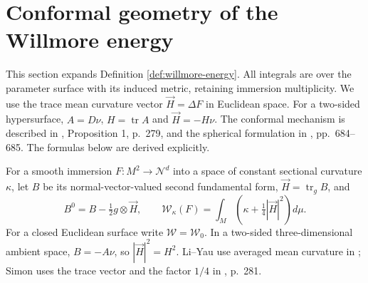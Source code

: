 \chapter{Conformal geometry of the Willmore energy}\label{sec:willmore-conformal-calculus}
This section expands Definition \ref{def:willmore-energy}. All integrals are over the parameter surface with its induced metric, retaining immersion multiplicity. We use the trace mean curvature vector $\vec H=\Delta F$ in Euclidean space. For a two-sided hypersurface, $A=D\nu$, $H=\operatorname{tr}A$ and $\vec H=-H\nu$. The conformal mechanism is described in \cite{LY82}, Proposition 1, p.~279, and the spherical formulation in \cite{MNWill}, pp.~684--685. The formulas below are derived explicitly.

\begin{definition}\label{def:willmore-vector-normalization}
For a smooth immersion $F:M^2\to\mathcal N^d$ into a space of constant sectional curvature $\kappa$, let $B$ be its normal-vector-valued second fundamental form, $\vec H=\operatorname{tr}_gB$, and
\[
 B^0=B-\tfrac12g\otimes\vec H,
 \qquad \mathcal W_\kappa(F)=\int_M\left(\kappa+\tfrac14|\vec H|^2\right)d\mu.
\]
For a closed Euclidean surface write $\mathcal W=\mathcal W_0$. In a two-sided three-dimensional ambient space, $B=-A\nu$, so $|\vec H|^2=H^2$. Li--Yau use averaged mean curvature in \cite{LY82}; Simon uses the trace vector and the factor $1/4$ in \cite{SimW93}, p.~281.
\end{definition}

